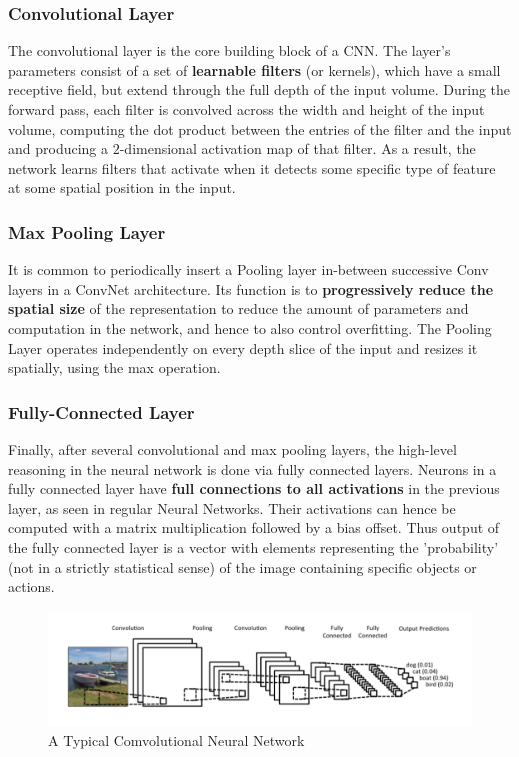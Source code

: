 \documentclass{article}
\begin{document}
				\subsubsection{Convolutional Layer}
					The convolutional layer is the core building block of a CNN. The layer's parameters consist of a set of \textbf{learnable filters} (or kernels), which have a small receptive field, but extend through the full depth of the input volume. During the forward pass, each filter is convolved across the width and height of the input volume, computing the dot product between the entries of the filter and the input and producing a $2$-dimensional activation map of that filter. As a result, the network learns filters that activate when it detects some specific type of feature at some spatial position in the input.

				\subsubsection{Max Pooling Layer}
					It is common to periodically insert a Pooling layer in-between successive Conv layers in a ConvNet architecture. Its function is to \textbf{progressively reduce the spatial size} of the representation to reduce the amount of parameters and computation in the network, and hence to also control overfitting. The Pooling Layer operates independently on every depth slice of the input and resizes it spatially, using the max operation.
				\subsubsection{Fully-Connected Layer}
					Finally, after several convolutional and max pooling layers, the high-level reasoning in the neural network is done via fully connected layers. Neurons in a fully connected layer have \textbf{full connections to all activations} in the previous layer, as seen in regular Neural Networks. Their activations can hence be computed with a matrix multiplication followed by a bias offset. Thus output of the fully connected layer is a vector with elements representing the 'probability' (not in a strictly statistical sense) of the image containing specific objects or actions.
				\begin{figure}[ht!]
					\includegraphics[width=14cm]{conv.png}
					\caption{A Typical Comvolutional Neural Network\label{fig4}}
				\end{figure}
\end{document}
